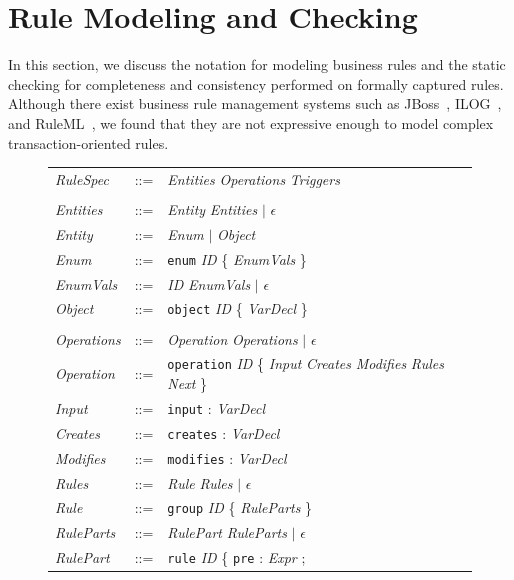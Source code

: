 
\newcommand{\term}{\textit}
\newcommand{\lit}{\texttt}

\section{Rule Modeling and Checking}
\label{sec:model}

In this section, we discuss the notation for modeling business rules and the
static checking for completeness and consistency performed on formally captured
rules. Although there exist business rule management systems such as JBoss~\cite{JBoss}, ILOG~\cite{ILog}, 
and RuleML~\cite{RuleML}, we found that they are not expressive enough to model
complex transaction-oriented rules.

\begin{figure}[t]
\centering
{\footnotesize
\tabcolsep=3pt
\begin{tabular}{lll}
\term{RuleSpec} & ::= & \term{Entities} \term{Operations} \term{Triggers} \\
\\
\term{Entities} & ::= & \term{Entity} \term{Entities} $|$ $\epsilon$ \\
\term{Entity} & ::= & \term{Enum} $|$ \term{Object} \\
\term{Enum} & ::= & \lit{enum} \term{ID} \{ \term{EnumVals} \} \\
\term{EnumVals} & ::= & \term{ID} \term{EnumVals} $|$ $\epsilon$ \\
\term{Object} & ::= & \lit{object} \term{ID} \{ \term{VarDecl} \} \\
\\
\term{Operations} & ::= & \term{Operation} \term{Operations} $|$ $\epsilon$ \\
\term{Operation} & ::= & \lit{operation} \term{ID} \{ \term{Input}
\term{Creates} \term{Modifies} \term{Rules} \term{Next} \} \\
\term{Input} & ::= & \lit{input} : \term{VarDecl} \\
\term{Creates} & ::= & \lit{creates} : \term{VarDecl} \\
\term{Modifies} & ::= & \lit{modifies} : \term{VarDecl} \\
\term{Rules} & ::= & \term{Rule} \term{Rules} $|$ $\epsilon$ \\
\term{Rule} & ::= & \lit{group} \term{ID} \{ \term{RuleParts} \} \\
\term{RuleParts} & ::= & \term{RulePart} \term{RuleParts} $|$ $\epsilon$ \\
\term{RulePart} & ::= & \lit{rule} \term{ID} \{ \lit{pre} : \term{Expr} ;

\end{tabular}}
\end{figure}
